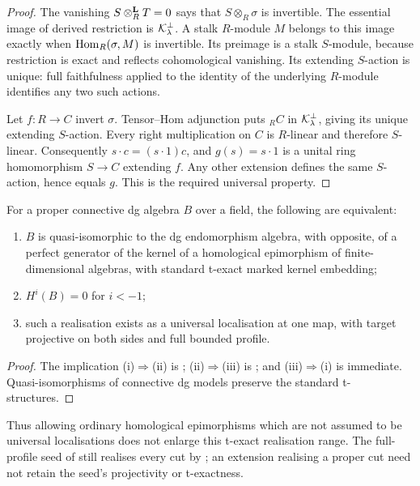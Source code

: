 \begin{proof}
The vanishing \(S\otimes^{\mathbf L}_RT=0\) says that \(S\otimes_R\sigma\) is invertible.  The essential image of derived restriction is \(\mathcal K_\lambda^\perp\).  A stalk \(R\)-module \(M\) belongs to this image exactly when \(\operatorname{Hom}_R(\sigma,M)\) is invertible.  Its preimage is a stalk \(S\)-module, because restriction is exact and reflects cohomological vanishing.  Its extending \(S\)-action is unique: full faithfulness applied to the identity of the underlying \(R\)-module identifies any two such actions.

Let \(f:R\to C\) invert \(\sigma\).  Tensor--Hom adjunction puts \({}_RC\) in \(\mathcal K_\lambda^\perp\), giving its unique extending \(S\)-action.  Every right multiplication on \(C\) is \(R\)-linear and therefore \(S\)-linear.  Consequently \(s\cdot c=(s\cdot1)c\), and \(g(s)=s\cdot1\) is a unital ring homomorphism \(S\to C\) extending \(f\).  Any other extension defines the same \(S\)-action, hence equals \(g\).  This is the required universal property.
\end{proof}

\begin{corollary}\label{cor:texact-classification}
For a proper connective dg algebra \(B\) over a field, the following are equivalent:
\begin{enumerate}[label=\textup{(\roman*)}]
\item \(B\) is quasi-isomorphic to the dg endomorphism algebra, with opposite, of a perfect generator of the kernel of a homological epimorphism of finite-dimensional algebras, with standard t-exact marked kernel embedding;
\item \(H^i(B)=0\) for \(i<-1\);
\item such a realisation exists as a universal localisation at one map, with target projective on both sides and full bounded profile.
\end{enumerate}
\end{corollary}

\begin{proof}
The implication (i)\(\Rightarrow\)(ii) is ; (ii)\(\Rightarrow\)(iii) is ; and (iii)\(\Rightarrow\)(i) is immediate.  Quasi-isomorphisms of connective dg models preserve the standard t-structures.
\end{proof}

Thus allowing ordinary homological epimorphisms which are not assumed to be universal localisations does not enlarge this t-exact realisation range.  The full-profile seed of  still realises every cut by ; an extension realising a proper cut need not retain the seed's projectivity or t-exactness.

